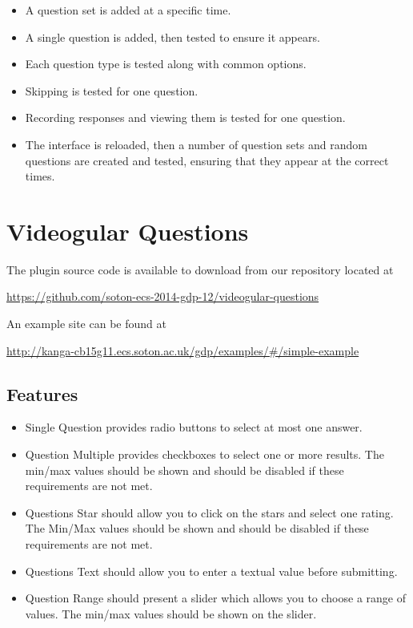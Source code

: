 \documentclass[12pt,a4paper]{article}
\begin{document}
\begin{itemize}
\item A question set is added at a specific time.
\item A single question is added, then tested to ensure it appears.
\item Each question type is tested along with common options.
\item Skipping is tested for one question.
\item Recording responses and viewing them is tested for one question.
\item The interface is reloaded, then a number of question sets and random questions are created and tested, ensuring that they appear at the correct times.
\end{itemize}

\section{Videogular Questions}

The plugin source code is available to download from our repository located at

\url{https://github.com/soton-ecs-2014-gdp-12/videogular-questions}

An example site can be found at

\url{http://kanga-cb15g11.ecs.soton.ac.uk/gdp/examples/#/simple-example}

\subsection{Features}

\begin{itemize}
\item Single Question provides radio buttons to select at most one answer.
\item Question Multiple provides checkboxes to select one or more results. The min/max values should be shown and  should be disabled if these requirements are not met.
\item Questions Star should allow you to click on the stars and select one rating. The Min/Max values should be shown and  should be disabled if these requirements are not met.
\item Questions Text should allow you to enter a textual value before submitting.
\item Question Range should present a slider which allows you to choose a range of values. The min/max values should be shown on the slider.
\end{itemize}
\end{document}
